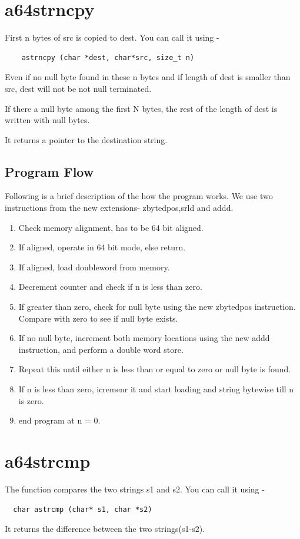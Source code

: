 \documentclass[12pt]{article}
\begin{document}
\section{a64strncpy}
First n bytes of src is copied to dest. You can call it using -
\begin{verbatim}
    astrncpy (char *dest, char*src, size_t n)
\end{verbatim}

Even if no null byte found in these n bytes and if length of dest is smaller than src, dest will not be not null terminated.

If there a null byte among the first N bytes, the rest of the length of dest is written with null bytes.


It returns a pointer to the destination string.


\subsection{Program Flow}

Following is a brief description of the how the program works. We use two instructions from the new extensions- zbytedpos,srld and addd. 


\begin{enumerate}
   \item Check memory alignment, has to be 64 bit aligned.
    \item If aligned, operate in 64 bit mode, else return.
    \item If aligned, load doubleword from memory.
    \item Decrement counter and check if n is less than zero.
    \item If greater than zero, check for null byte using the new zbytedpos instruction. Compare with zero to see if null byte exists.
    \item If no null byte, increment both memory locations using the new addd instruction, and perform a double word store.
    \item Repeat this until either n is less than or equal to zero or null byte is found.
    \item If n is less than zero, icremenr it and start loading and string bytewise till n is zero.
    \item end program at n = 0.
 
\end{enumerate}

\section{a64strcmp}
The function  compares  the two strings s1 and s2. You can call it using -
\begin{verbatim}
  char astrcmp (char* s1, char *s2)  
\end{verbatim}
It returns the difference between the two strings(s1-s2).
\end{document}
